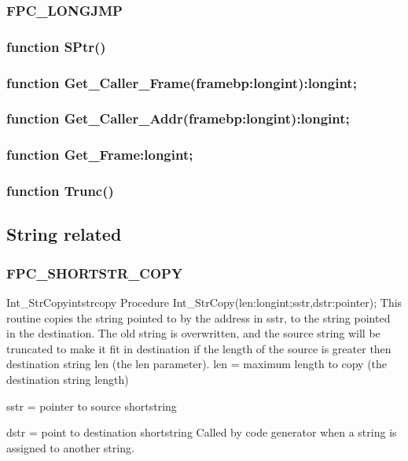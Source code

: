 \documentclass [12pt]{article}
\begin{document}
\subsubsection{FPC{\_}LONGJMP}
\label{subsubsec:mylabel31}

\subsubsection{function SPtr()}
\label{subsubsec:function}

\subsubsection{function Get{\_}Caller{\_}Frame(framebp:longint):longint;}
\label{subsubsec:mylabel32}

\subsubsection{function Get{\_}Caller{\_}Addr(framebp:longint):longint;}
\label{subsubsec:mylabel33}

\subsubsection{function Get{\_}Frame:longint;}
\label{subsubsec:mylabel34}

\subsubsection{function Trunc()}
\label{subsubsec:mylabel35}

\subsection{String related}
\label{subsec:string}

\subsubsection{FPC{\_}SHORTSTR{\_}COPY}
\label{subsubsec:mylabel36}

\begin{procedurel}{Int{\_}StrCopy}{intstrcopy}
\Declaration
Procedure Int{\_}StrCopy(len:longint;sstr,dstr:pointer);
\Description 
This routine copies the string pointed to by the address in sstr, to the
string pointed in the destination. The old string is overwritten, and the
source string will be truncated to make it fit in destination if the length
of the source is greater then destination string len (the len parameter).
\Parameters 
len = maximum length to copy (the destination string length) \par 
sstr = pointer to source shortstring \par 
dstr = point to destination shortstring
\Notes 
Called by code generator when a string is assigned to another string. 
\end{procedurel}
\end{document}
